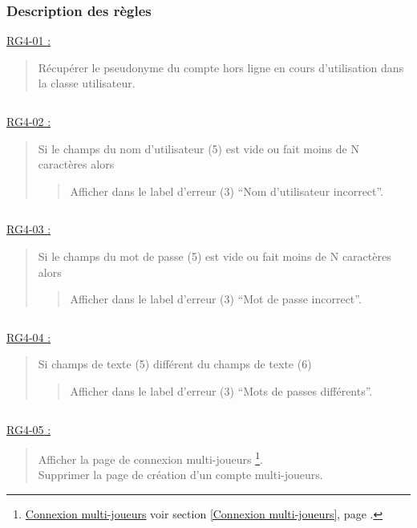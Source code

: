 \documentclass{report}
\begin{document}
		\subsubsection{Description des règles}

			\underline{RG4-01 :}
				\begin{quote}
					Récupérer le pseudonyme du compte hors ligne en cours d'utilisation dans la classe utilisateur.
				\end{quote}
				
			$\,$

			\underline{RG4-02 :}
				\begin{quote}
					Si le champs du nom d'utilisateur (5) est vide ou fait moins de N caractères alors
					\begin{quote}
						Afficher dans le label d'erreur (3) ``Nom d'utilisateur incorrect''.
					\end{quote}
				\end{quote}

			$\,$

			\underline{RG4-03 :}
				\begin{quote}
					Si le champs du mot de passe (5) est vide ou fait moins de N caractères alors
					\begin{quote}
						Afficher dans le label d'erreur (3) ``Mot de passe incorrect''.
					\end{quote}
				\end{quote}
			
			$\,$	
			
			\underline{RG4-04 :}
				\begin{quote}
					Si champs de texte (5) différent du champs de texte (6)
					\begin{quote}
						Afficher dans le label d'erreur (3) ``Mots de passes différents''.
					\end{quote}
				\end{quote}

			$\,$				
				
			\underline{RG4-05 :}
				\begin{quote}
					Afficher la page de connexion multi-joueurs%
						\footnote[1]{
							\hyperlink{Connexion multi-joueurs}{Connexion multi-joueurs}
							\og voir section \ref{Connexion multi-joueurs}, page \pageref{Connexion multi-joueurs}.\fg
						}.\\
					Supprimer la page de création d'un compte multi-joueurs.
				\end{quote}
				
\end{document}
